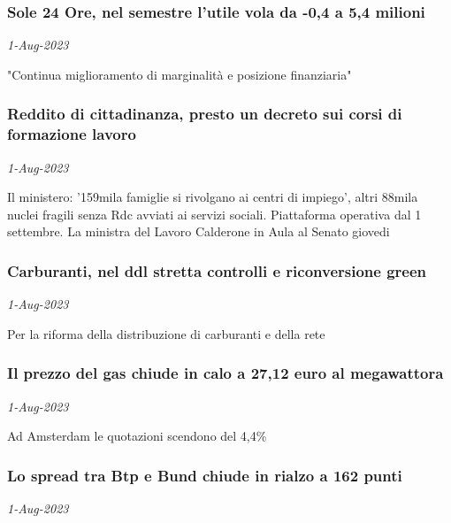 \subsubsection{Sole 24 Ore, nel semestre l'utile vola da -0,4 a 5,4 milioni \href{https://www.ansa.it/sito/notizie/economia/2023/08/01/sole-24-ore-nel-semestre-lutile-vola-da-04-a-54-milioni_0c746576-bf32-40a3-9783-0c7f26330d3e.html}{}}
\textit{1-Aug-2023}

"Continua miglioramento di marginalit\`{a} e posizione finanziaria"
\subsubsection{Reddito di cittadinanza, presto un decreto sui corsi di formazione lavoro \href{https://www.ansa.it/sito/notizie/economia/2023/08/01/reddito-di-cittadinanza-presto-un-decreto-sui-corsi-di-formazione-lavoro_a1b223dd-3d04-4255-b7b7-144097649487.html}{}}
\textit{1-Aug-2023}

Il ministero: '159mila famiglie si rivolgano ai centri di impiego', altri 88mila nuclei fragili senza Rdc avviati ai servizi sociali. Piattaforma operativa dal 1 settembre. La ministra del Lavoro Calderone in Aula al Senato giovedi
\subsubsection{Carburanti, nel ddl stretta controlli e riconversione green \href{https://www.ansa.it/sito/notizie/economia/2023/08/01/carburanti-nel-ddl-stretta-controlli-e-riconversione-green_1d331ca7-83c7-482a-b66a-4bda7301cc7a.html}{}}
\textit{1-Aug-2023}

Per la riforma della distribuzione di carburanti e della rete
\subsubsection{Il prezzo del gas chiude in calo a 27,12 euro al megawattora \href{https://www.ansa.it/sito/notizie/economia/2023/08/01/il-prezzo-del-gas-chiude-in-calo-a-2712-euro-al-megawattora_e0d44722-23ab-4f8b-8eda-659993db1d56.html}{}}
\textit{1-Aug-2023}

Ad Amsterdam le quotazioni scendono del 4,4\%
\subsubsection{Lo spread tra Btp e Bund chiude in rialzo a 162 punti \href{https://www.ansa.it/sito/notizie/economia/2023/08/01/lo-spread-tra-btp-e-bund-chiude-in-rialzo-a-162-punti_24618691-7185-4748-a7b5-6eb806c6c70e.html}{}}
\textit{1-Aug-2023}


